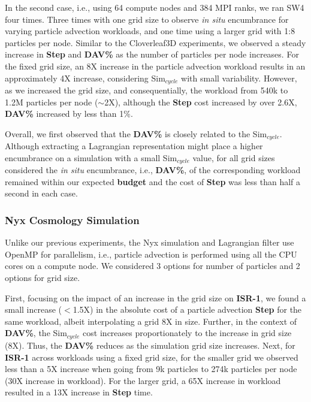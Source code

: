 In the second case, i.e., using 64 compute nodes and 384 MPI ranks, we ran SW4 four times. 
%
Three times with one grid size to observe \textit{in situ} encumbrance for varying particle advection workloads, and one time using a larger grid with 1:8 particles per node.
%
Similar to the Cloverleaf3D experiments, we observed a steady increase in \textbf{Step} and \textbf{DAV\%} as the number of particles per node increases.
%
For the fixed grid size, an 8X increase in the particle advection workload results in an approximately 4X increase, considering Sim$_{cycle}$ with small variability.
%
However, as we increased the grid size, and consequentially, the workload from 540k to 1.2M particles per node ($\sim$2X), although the \textbf{Step} cost increased by over 2.6X, \textbf{DAV\%} increased by less than 1\%.
%

Overall, we first observed that the \textbf{DAV\%} is closely related to the Sim$_{cycle}$. 
%
Although extracting a Lagrangian representation might place a higher encumbrance on a simulation with a small Sim$_{cycle}$ value, for all grid sizes considered the \textit{in situ} encumbrance, i.e., \textbf{DAV\%}, of the corresponding workload remained within our expected \textbf{budget} and the cost of \textbf{Step} was less than half a second in each case.

\subsubsection{Nyx Cosmology Simulation}
Unlike our previous experiments, the Nyx simulation and Lagrangian filter use OpenMP for parallelism, i.e., particle advection is performed using all the CPU cores on a compute node.
%
We considered 3 options for number of particles and 2 options for grid size.
%

First, focusing on the impact of an increase in the grid size on \textbf{ISR-1}, we found a small increase ($<$1.5X) in the absolute cost of a particle advection \textbf{Step} for the same workload, albeit interpolating a grid 8X in size.
%
Further, in the context of \textbf{DAV\%}, the Sim$_{cycle}$ cost increases proportionately to the increase in grid size (8X).
%
Thus, the \textbf{DAV\%} reduces as the simulation grid size increases.
%
Next, for \textbf{ISR-1} across workloads using a fixed grid size, for the smaller grid we observed less than a 5X increase when going from 9k particles to 274k particles per node (30X increase in workload).
%
For the larger grid, a 65X increase in workload resulted in a 13X increase in \textbf{Step} time.

